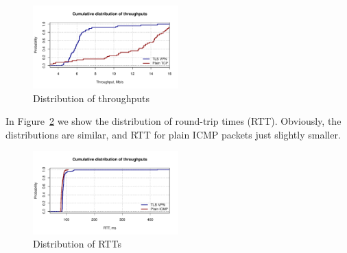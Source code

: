 \begin{figure}[!h]
        \includegraphics[width=0.5\textwidth]{graphics/throughput.pdf}
        \caption{Distribution of throughputs}
        \label{fig:iperf_distr}
\end{figure}

In Figure~\ref{fig:rtt} we show the distribution of round-trip times
(RTT). Obviously, the distributions are similar, and RTT for
plain ICMP packets just slightly smaller.

\begin{figure}[!h]
        \includegraphics[width=0.5\textwidth]{graphics/rtt.pdf}
        \caption{Distribution of RTTs}
        \label{fig:rtt}
\end{figure}
